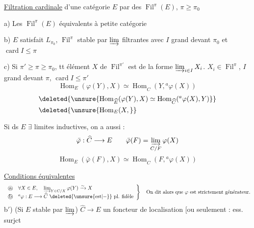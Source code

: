 \uline{Filtration cardinale} d'une catégorie $E$  par des $\operatorname{Fil}^{\pi}(E)$, $\pi\geq\pi_0$

a) Les $\operatorname{Fil}^{\pi}(E)$ équivalents à petite catégorie

b)  $E$ satisfait $L_{\pi_0}$, $\operatorname{Fil}^{\pi}$ stable par $\varinjlim$ filtrantes  avec $I$ grand devant $\pi_0$ et $\operatorname{card}I\leq\pi$

c) Si $\pi'\geq\pi\geq\pi_0$, tt élément $X$ de $\operatorname{Fil}^{\pi'}$ est de la forme $\varinjlim_{i\in I}X_i$. $X_i\in\operatorname{Fil}^\pi$, $I$ grand devant $\pi$, $\operatorname{card}I\leq\pi'$
\[
 \operatorname{Hom}_E(\varphi(Y),X)\simeq\operatorname{Hom}_{\widehat C}(Y,{}^a\varphi(X))
\]
\[
 \begin{aligned}
 &\deleted{\unsure{\operatorname{Hom}_{\widehat E}(\varphi(Y),X)\simeq\operatorname{Hom}_{\widehat C}({}^a\varphi(X),Y)}}\\
 &\deleted{\unsure{\operatorname{Hom}_E(X,}}
 \end{aligned}
\]

Si ds $E$ $\exists$  limites inductives, on a aussi :
\[
 \bar\varphi:\widehat C\longrightarrow E\qquad
 \bar\varphi(F)=\varinjlim_{C/F}\varphi(X)
\]
\[
 \operatorname{Hom}_{E}(\bar\varphi(F),X)\simeq\operatorname{Hom}_{\widehat C}(F,{}^a\varphi(X))
\]

\uline{Conditions équivalentes}
\[
 \left.\begin{array}{ll}
 \text{\textcircled{a}}&\forall X\in E,\quad\varinjlim_{Y\in C/X}\varphi(Y)\xrightarrow{\sim}X\\
 \text{\textcircled{b}}&{}^a\varphi:E\longrightarrow\widehat C\ \deleted{\unsure{\mathrm{est}|-}}\ \text{pl. fidèle}
 \end{array}\right\}\quad\text{On dit alors que $\varphi$ est strictement générateur.}
\]
b$'$) (Si $E$ stable par  $\varinjlim$) $\widehat C\to E$ un foncteur de localisation [ou seulement : ess. surjct

